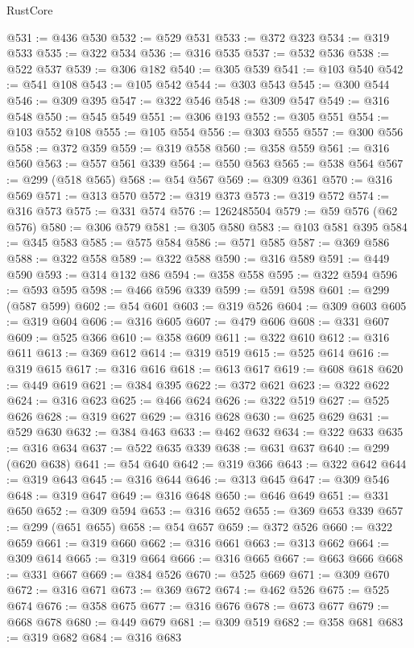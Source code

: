 \begin{lexlean}{RustCore}
\begin{coremodule}
@531 := @436 @530
@532 := @529 @531
@533 := @372 @323
@534 := @319 @533
@535 := @322 @534
@536 := @316 @535
@537 := @532 @536
@538 := @522 @537
@539 := @306 @182
@540 := @305 @539
@541 := @103 @540
@542 := @541 @108
@543 := @105 @542
@544 := @303 @543
@545 := @300 @544
@546 := @309 @395
@547 := @322 @546
@548 := @309 @547
@549 := @316 @548
@550 := @545 @549
@551 := @306 @193
@552 := @305 @551
@554 := @103 @552 @108
@555 := @105 @554
@556 := @303 @555
@557 := @300 @556
@558 := @372 @359
@559 := @319 @558
@560 := @358 @559
@561 := @316 @560
@563 := @557 @561 @339
@564 := @550 @563
@565 := @538 @564
@567 := @299 (@518 @565)
@568 := @54 @567
@569 := @309 @361
@570 := @316 @569
@571 := @313 @570
@572 := @319 @373
@573 := @319 @572
@574 := @316 @573
@575 := @331 @574
@576 := 1262485504
@579 := @59 @576 (@62 @576)
@580 := @306 @579
@581 := @305 @580
@583 := @103 @581 @395
@584 := @345 @583
@585 := @575 @584
@586 := @571 @585
@587 := @369 @586
@588 := @322 @558
@589 := @322 @588
@590 := @316 @589
@591 := @449 @590
@593 := @314 @132 @86
@594 := @358 @558
@595 := @322 @594
@596 := @593 @595
@598 := @466 @596 @339
@599 := @591 @598
@601 := @299 (@587 @599)
@602 := @54 @601
@603 := @319 @526
@604 := @309 @603
@605 := @319 @604
@606 := @316 @605
@607 := @479 @606
@608 := @331 @607
@609 := @525 @366
@610 := @358 @609
@611 := @322 @610
@612 := @316 @611
@613 := @369 @612
@614 := @319 @519
@615 := @525 @614
@616 := @319 @615
@617 := @316 @616
@618 := @613 @617
@619 := @608 @618
@620 := @449 @619
@621 := @384 @395
@622 := @372 @621
@623 := @322 @622
@624 := @316 @623
@625 := @466 @624
@626 := @322 @519
@627 := @525 @626
@628 := @319 @627
@629 := @316 @628
@630 := @625 @629
@631 := @529 @630
@632 := @384 @463
@633 := @462 @632
@634 := @322 @633
@635 := @316 @634
@637 := @522 @635 @339
@638 := @631 @637
@640 := @299 (@620 @638)
@641 := @54 @640
@642 := @319 @366
@643 := @322 @642
@644 := @319 @643
@645 := @316 @644
@646 := @313 @645
@647 := @309 @546
@648 := @319 @647
@649 := @316 @648
@650 := @646 @649
@651 := @331 @650
@652 := @309 @594
@653 := @316 @652
@655 := @369 @653 @339
@657 := @299 (@651 @655)
@658 := @54 @657
@659 := @372 @526
@660 := @322 @659
@661 := @319 @660
@662 := @316 @661
@663 := @313 @662
@664 := @309 @614
@665 := @319 @664
@666 := @316 @665
@667 := @663 @666
@668 := @331 @667
@669 := @384 @526
@670 := @525 @669
@671 := @309 @670
@672 := @316 @671
@673 := @369 @672
@674 := @462 @526
@675 := @525 @674
@676 := @358 @675
@677 := @316 @676
@678 := @673 @677
@679 := @668 @678
@680 := @449 @679
@681 := @309 @519
@682 := @358 @681
@683 := @319 @682
@684 := @316 @683

\end{coremodule}
\end{lexlean}

